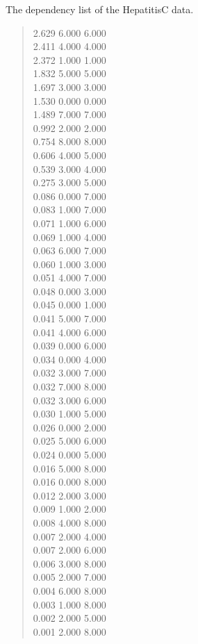\documentclass[a4paper]{article}
\begin{document}
The dependency list of the HepatitisC data.
%
\begin{quote}

2.629  6.000  6.000 \\
2.411  4.000  4.000 \\
2.372  1.000  1.000 \\
1.832  5.000  5.000 \\
1.697  3.000  3.000 \\
1.530  0.000  0.000 \\
1.489  7.000  7.000 \\
0.992  2.000  2.000 \\
0.754  8.000  8.000 \\
0.606  4.000  5.000 \\
0.539  3.000  4.000 \\
0.275  3.000  5.000 \\
0.086  0.000  7.000 \\
0.083  1.000  7.000 \\
0.071  1.000  6.000 \\
0.069  1.000  4.000 \\
0.063  6.000  7.000 \\
0.060  1.000  3.000 \\
0.051  4.000  7.000 \\
0.048  0.000  3.000 \\
0.045  0.000  1.000 \\
0.041  5.000  7.000 \\
0.041  4.000  6.000 \\
0.039  0.000  6.000 \\
0.034  0.000  4.000 \\
0.032  3.000  7.000 \\
0.032  7.000  8.000 \\
0.032  3.000  6.000 \\
0.030  1.000  5.000 \\
0.026  0.000  2.000 \\
0.025  5.000  6.000 \\
0.024  0.000  5.000 \\
0.016  5.000  8.000 \\
0.016  0.000  8.000 \\
0.012  2.000  3.000 \\
0.009  1.000  2.000 \\
0.008  4.000  8.000 \\
0.007  2.000  4.000 \\
0.007  2.000  6.000 \\
0.006  3.000  8.000 \\
0.005  2.000  7.000 \\
0.004  6.000  8.000 \\
0.003  1.000  8.000 \\
0.002  2.000  5.000 \\
0.001  2.000  8.000 \\

\end{quote}
\end{document}
